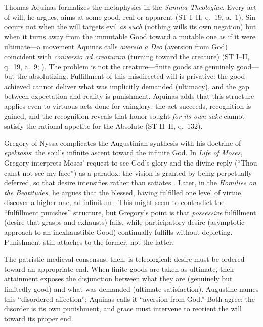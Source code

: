 Thomas Aquinas formalizes the metaphysics in the \emph{Summa Theologiae}. Every act of will,
he argues, aims at some good, real or apparent (ST I--II, q.~19, a.~1). Sin occurs not when
the will targets evil \emph{as such} (nothing wills its own negation) but when it turns away
from the immutable Good toward a mutable one as if it were ultimate---a movement Aquinas calls
\emph{aversio a Deo} (aversion from God) coincident with \emph{conversio ad creaturam}
(turning toward the creature) (ST I--II, q.~19, a.~9; \parencite{AquinasST1947}). The
problem is not the creature---finite goods are genuinely good---but the absolutizing.
Fulfillment of this misdirected will is privative: the good achieved cannot deliver what was
implicitly demanded (ultimacy), and the gap between expectation and reality is punishment.
Aquinas adds that this structure applies even to virtuous acts done for vainglory: the act
succeeds, recognition is gained, and the recognition reveals that honor sought \emph{for its
	own sake} cannot satisfy the rational appetite for the Absolute (ST II--II, q.~132).

Gregory of Nyssa complicates the Augustinian synthesis with his doctrine of \emph{epektasis}:
the soul's infinite ascent toward the infinite God. In \emph{Life of Moses}, Gregory interprets
Moses' request to see God's glory and the divine reply (``Thou canst not see my face'') as a
paradox: the vision is granted by being perpetually deferred, so that desire intensifies
rather than satiates \parencite[pp.~113--114]{GregoryMoses1978}. Later, in the \emph{Homilies
	on the Beatitudes}, he argues that the blessed, having fulfilled one level of virtue, discover
a higher one, ad infinitum \parencite[p.~31]{GregoryBeatitudes1954}. This might seem to
contradict the ``fulfillment punishes'' structure, but Gregory's point is that
\emph{possessive} fulfillment (desire that grasps and exhausts) fails, while participatory
desire (asymptotic approach to an inexhaustible Good) continually fulfills without depleting.
Punishment still attaches to the former, not the latter.

The patristic-medieval consensus, then, is teleological: desire must be ordered toward an
appropriate end. When finite goods are taken as ultimate, their attainment exposes the
disjunction between what they are (genuinely but limitedly good) and what was demanded
(ultimate satisfaction). Augustine names this ``disordered affection''; Aquinas calls it
``aversion from God.'' Both agree: the disorder is its own punishment, and grace must
intervene to reorient the will toward its proper end.
